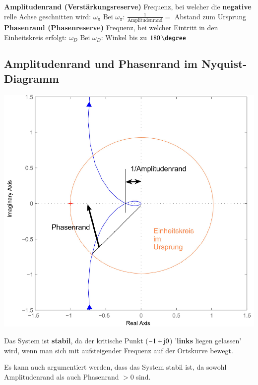\begin{outline}
    \1 \textbf{Amplitudenrand (Verstärkungsreserve)}
        \2 Frequenz, bei welcher die \textbf{negative} relle Achse geschnitten wird: $\omega_{\pi}$
        \2 Bei $\omega_{\pi}$: $\frac{1}{\text{Amplitudenrand}} =$ Abstand zum Ursprung
    \1 \textbf{Phasenrand (Phasenreserve)}
        \2 Frequenz, bei welcher Eintritt in den Einheitskreis erfolgt: $\omega_D$
        \2 Bei $\omega_D$: Winkel bis zu $180 \, \degree$
\end{outline}


\subsection{Amplitudenrand und Phasenrand im Nyquist-Diagramm}

\begin{minipage}[c]{0.5\columnwidth}
    \includegraphics[width=\columnwidth]{images/nyquist_amplitudenrand_phasenrand.png}
\end{minipage}
\hfill
\begin{minipage}[c]{0.45\columnwidth}
    Das System ist \textbf{stabil}, da der kritische Punkt ($-1 + \mathrm{j} 0$) '\textbf{links} liegen gelassen'
    wird, wenn man sich mit aufsteigender Frequenz auf der Ortskurve bewegt.

    Es kann auch argumentiert werden, dass das System stabil ist, da sowohl Amplitudenrand als auch Phasenrand $> 0$ sind.
\end{minipage}

